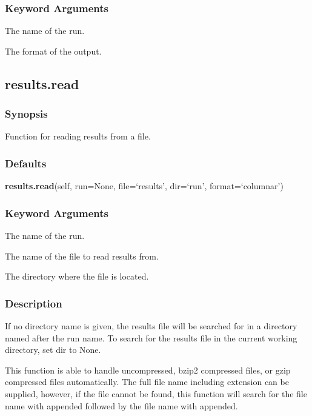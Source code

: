  \subsubsection{Keyword Arguments} 

   The name of the run.   

   The format of the output.  

  

  

 \newpage 

 \subsection{results.read} 

  
 \subsubsection{Synopsis} 

 Function for reading results from a file. 
  

  
 \subsubsection{Defaults} 

 \textsf{\textbf{results.read}(self, run=None, file=`results', dir=`run', format=`columnar')} 

  
 \subsubsection{Keyword Arguments} 

   The name of the run.   

   The name of the file to read results from.   

   The directory where the file is located.  

  

  
 \subsubsection{Description} 

 If no directory name is given, the results file will be searched for in a directory named after the run name.  To search for the results file in the current working directory, set dir to None. 
  

 This function is able to handle uncompressed, bzip2 compressed files, or gzip compressed files automatically.  The full file name including extension can be supplied, however, if the file cannot be found, this function will search for the file name with  appended followed by the file name with  appended. 
  

